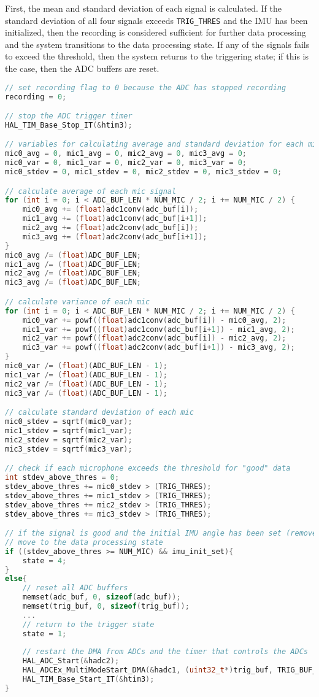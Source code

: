 \documentclass[12pt,a4paper]{report}
\begin{document}
First, the mean and standard deviation of each signal is calculated. If the standard deviation of all four signals exceeds \verb|TRIG_THRES| and the IMU has been initialized, then the recording is considered sufficient for further data processing and the system transitions to the data processing state. If any of the signals fails to exceed the threshold, then the system returns to the triggering state; if this is the case, then the ADC buffers are reset. 

\begin{lstlisting}[language=C++]
// set recording flag to 0 because the ADC has stopped recording
recording = 0;

// stop the ADC trigger timer
HAL_TIM_Base_Stop_IT(&htim3);

// variables for calculating average and standard deviation for each microphone
mic0_avg = 0, mic1_avg = 0, mic2_avg = 0, mic3_avg = 0;
mic0_var = 0, mic1_var = 0, mic2_var = 0, mic3_var = 0;
mic0_stdev = 0, mic1_stdev = 0, mic2_stdev = 0, mic3_stdev = 0;

// calculate average of each mic signal
for (int i = 0; i < ADC_BUF_LEN * NUM_MIC / 2; i += NUM_MIC / 2) {
	mic0_avg += (float)adc1conv(adc_buf[i]);
	mic1_avg += (float)adc1conv(adc_buf[i+1]);
	mic2_avg += (float)adc2conv(adc_buf[i]);
	mic3_avg += (float)adc2conv(adc_buf[i+1]);
}
mic0_avg /= (float)ADC_BUF_LEN;
mic1_avg /= (float)ADC_BUF_LEN;
mic2_avg /= (float)ADC_BUF_LEN;
mic3_avg /= (float)ADC_BUF_LEN;

// calculate variance of each mic
for (int i = 0; i < ADC_BUF_LEN * NUM_MIC / 2; i += NUM_MIC / 2) {
	mic0_var += powf((float)adc1conv(adc_buf[i]) - mic0_avg, 2);
	mic1_var += powf((float)adc1conv(adc_buf[i+1]) - mic1_avg, 2);
	mic2_var += powf((float)adc2conv(adc_buf[i]) - mic2_avg, 2);
	mic3_var += powf((float)adc2conv(adc_buf[i+1]) - mic3_avg, 2);
}
mic0_var /= (float)(ADC_BUF_LEN - 1);
mic1_var /= (float)(ADC_BUF_LEN - 1);
mic2_var /= (float)(ADC_BUF_LEN - 1);
mic3_var /= (float)(ADC_BUF_LEN - 1);

// calculate standard deviation of each mic
mic0_stdev = sqrtf(mic0_var);
mic1_stdev = sqrtf(mic1_var);
mic2_stdev = sqrtf(mic2_var);
mic3_stdev = sqrtf(mic3_var);

// check if each microphone exceeds the threshold for "good" data
int stdev_above_thres = 0;
stdev_above_thres += mic0_stdev > (TRIG_THRES);
stdev_above_thres += mic1_stdev > (TRIG_THRES);
stdev_above_thres += mic2_stdev > (TRIG_THRES);
stdev_above_thres += mic3_stdev > (TRIG_THRES);

// if the signal is good and the initial IMU angle has been set (remove yaw), then
// move to the data processing state
if ((stdev_above_thres >= NUM_MIC) && imu_init_set){
	state = 4;
}
else{
	// reset all ADC buffers
	memset(adc_buf, 0, sizeof(adc_buf));
	memset(trig_buf, 0, sizeof(trig_buf));
	...
	// return to the trigger state
	state = 1;
	
	// restart the DMA from ADCs and the timer that controls the ADCs
	HAL_ADC_Start(&hadc2);
	HAL_ADCEx_MultiModeStart_DMA(&hadc1, (uint32_t*)trig_buf, TRIG_BUF_LEN * NUM_MIC / 2);
	HAL_TIM_Base_Start_IT(&htim3);
}
\end{lstlisting}
\end{document}
